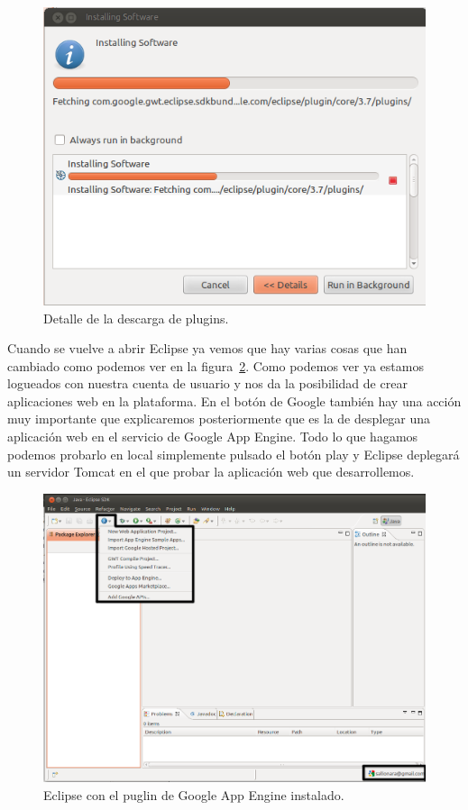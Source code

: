 \begin{figure}
  \centering
    \includegraphics[scale=0.6]{./ConfiguracionEclipse/imagenes/instalacionPlugins.png}
  \caption{Detalle de la descarga de plugins.}
  \label{fig:instalacionPlugins}
\end{figure}

Cuando se vuelve a abrir Eclipse ya vemos que hay varias cosas que han cambiado como podemos ver en la figura~\ref{fig:eclipseGAE}. Como podemos ver ya estamos logueados con nuestra cuenta de usuario y nos da la posibilidad de crear aplicaciones web en la plataforma. En el botón de Google también hay una acción muy importante que explicaremos posteriormente que es la de desplegar una aplicación web en el servicio de Google App Engine. Todo lo que hagamos podemos probarlo en local simplemente pulsado el botón play y Eclipse deplegará un servidor Tomcat en el que probar la aplicación web que desarrollemos.

\begin{figure}
  \centering
    \includegraphics[scale=0.6]{./ConfiguracionEclipse/imagenes/eclipseGAE.png}
  \caption{Eclipse con el puglin de Google App Engine instalado.}
  \label{fig:eclipseGAE}
\end{figure}

